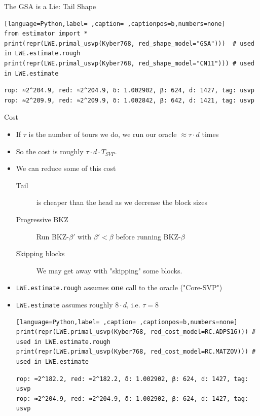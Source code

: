 \documentclass[table,10pt,aspectratio=169]{beamer}
\begin{document}
\begin{frame}[label={sec:org0ce3b26},fragile]{The GSA is a Lie: Tail Shape}
 \begin{lstlisting}[language=Python,label= ,caption= ,captionpos=b,numbers=none]
from estimator import *
print(repr(LWE.primal_usvp(Kyber768, red_shape_model="GSA")))  # used in LWE.estimate.rough
print(repr(LWE.primal_usvp(Kyber768, red_shape_model="CN11"))) # used in LWE.estimate
\end{lstlisting}

\begin{verbatim}
rop: ≈2^204.9, red: ≈2^204.9, δ: 1.002902, β: 624, d: 1427, tag: usvp
rop: ≈2^209.9, red: ≈2^209.9, δ: 1.002842, β: 642, d: 1421, tag: usvp
\end{verbatim}
\end{frame}

\begin{frame}[label={sec:org20f6092},fragile]{Cost}
 \begin{itemize}
\item If \(\tau\)  is the number of tours we do, we run our oracle \(\approx \tau \cdot d\) times
\item So the cost is roughly \(\tau \cdot d \cdot T_{SVP}\).
\item We can reduce some of this cost
\begin{description}
\item[{Tail}] is cheaper than the head as we decrease the block sizes
\item[{Progressive BKZ}] Run BKZ-\(\beta'\) with \(\beta' < \beta\) before running BKZ-\(\beta\)
\item[{Skipping blocks}] We may get away with "skipping" some blocks.
\end{description}
\item \texttt{LWE.estimate.rough} assumes \textbf{one} call to the oracle ("Core-SVP")
\item \texttt{LWE.estimate} assumes roughly \(8 \cdot d\), i.e. \(\tau = 8\)

\begin{lstlisting}[language=Python,label= ,caption= ,captionpos=b,numbers=none]
print(repr(LWE.primal_usvp(Kyber768, red_cost_model=RC.ADPS16))) # used in LWE.estimate.rough
print(repr(LWE.primal_usvp(Kyber768, red_cost_model=RC.MATZOV))) # used in LWE.estimate
\end{lstlisting}

\begin{verbatim}
rop: ≈2^182.2, red: ≈2^182.2, δ: 1.002902, β: 624, d: 1427, tag: usvp
rop: ≈2^204.9, red: ≈2^204.9, δ: 1.002902, β: 624, d: 1427, tag: usvp
\end{verbatim}
\end{itemize}
\end{frame}
\end{document}
